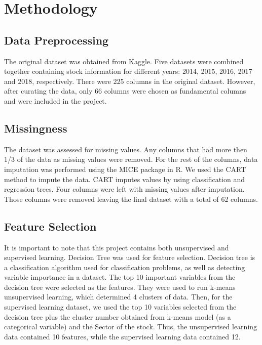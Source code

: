 \documentclass[11pt,]{article}
\begin{document}
\hypertarget{methodology}{%
\section{Methodology}\label{methodology}}

\hypertarget{data-preprocessing}{%
\subsection{Data Preprocessing}\label{data-preprocessing}}

The original dataset was obtained from Kaggle. Five datasets were
combined together containing stock information for different years:
2014, 2015, 2016, 2017 and 2018, respectively. There were 225 columns in
the original dataset. However, after curating the data, only 66 columns
were chosen as fundamental columns and were included in the project.

\hypertarget{missingness}{%
\subsection{Missingness}\label{missingness}}

The dataset was assessed for missing values. Any columns that had more
then 1/3 of the data as missing values were removed. For the rest of the
columns, data imputation was performed using the MICE package in R. We
used the CART method to impute the data. CART imputes values by using
classification and regression trees. Four columns were left with missing
values after imputation. Those columns were removed leaving the final
dataset with a total of 62 columns.

\hypertarget{feature-selection}{%
\subsection{Feature Selection}\label{feature-selection}}

It is important to note that this project contains both unsupervised and
supervised learning. Decision Tree was used for feature selection.
Decision tree is a classification algorithm used for classification
problems, as well as detecting variable importance in a dataset. The top
10 important variables from the decision tree were selected as the
features. They were used to run k-means unsupervised learning, which
determined 4 clusters of data. Then, for the supervised learning
dataset, we used the top 10 variables selected from the decision tree
plus the cluster number obtained from k-means model (as a categorical
variable) and the Sector of the stock. Thus, the unsupervised learning
data contained 10 features, while the supervised learning data contained
12.
\end{document}
